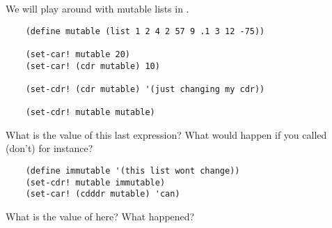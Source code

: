 \documentclass{../../../tp}
\begin{document}
\begin{instruction}
	We will play around with mutable lists in \scheme.

	\begin{verbatim}
	(define mutable (list 1 2 4 2 57 9 .1 3 12 -75))

	(set-car! mutable 20)
	(set-car! (cdr mutable) 10)
	
	(set-cdr! (cdr mutable) '(just changing my cdr))
	 
	(set-cdr! mutable mutable)
	 \end{verbatim}

	What is the value of this last expression? What would happen if you called (don't)  for instance?
	
	\begin{verbatim}	
	(define immutable '(this list wont change))
	(set-cdr! mutable immutable)
	(set-car! (cdddr mutable) 'can)
	 \end{verbatim}
	 
	 What is the value of  here? What happened?	
\end{instruction}
\end{document}
